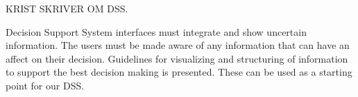KRIST SKRIVER OM DSS.

Decision Support System interfaces must integrate and show uncertain information. The users must be made aware of any information that can have an affect on their decision. Guidelines for visualizing and structuring of information to support the best decision making is presented. These can be used as a starting point for our DSS.